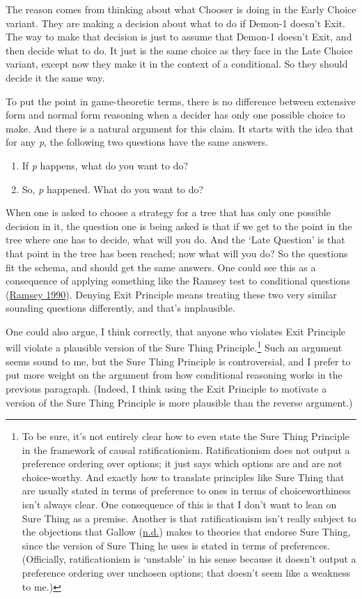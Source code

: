 \documentclass[
  12pt,
  letterpaper,
  DIV=11,
  numbers=noendperiod]{scrreprt}
\providecommand{\tightlist}{%
  \setlength{\itemsep}{0pt}\setlength{\parskip}{0pt}}\usepackage{longtable,booktabs,array}
\begin{document}
The reason comes from thinking about what Chooser is doing in the Early
Choice variant. They are making a decision about what to do if Demon-1
doesn't Exit. The way to make that decision is just to assume that
Demon-1 doesn't Exit, and then decide what to do. It just is the same
choice as they face in the Late Choice variant, except now they make it
in the context of a conditional. So they should decide it the same way.

To put the point in game-theoretic terms, there is no difference between
extensive form and normal form reasoning when a decider has only one
possible choice to make. And there is a natural argument for this claim.
It starts with the idea that for any \emph{p}, the following two
questions have the same answers.

\begin{enumerate}
\def\labelenumi{\arabic{enumi}.}
\tightlist
\item
  If \emph{p} happens, what do you want to do?
\item
  So, \emph{p} happened. What do you want to do?
\end{enumerate}

When one is asked to choose a strategy for a tree that has only one
possible decision in it, the question one is being asked is that if we
get to the point in the tree where one has to decide, what will you do.
And the `Late Question' is that that point in the tree has been reached;
now what will you do? So the questions fit the schema, and should get
the same answers. One could see this as a consequence of applying
something like the Ramsey test to conditional questions
(\protect\hyperlink{ref-RamseyGeneralProp}{Ramsey 1990}). Denying Exit
Principle means treating these two very similar sounding questions
differently, and that's implausible.

One could also argue, I think correctly, that anyone who violates Exit
Principle will violate a plausible version of the Sure Thing
Principle.\footnote{To be sure, it's not entirely clear how to even
  state the Sure Thing Principle in the framework of causal
  ratificationism. Ratificationism does not output a preference ordering
  over options; it just says which options are and are not
  choice-worthy. And exactly how to translate principles like Sure Thing
  that are usually stated in terms of preference to ones in terms of
  choiceworthiness isn't always clear. One consequence of this is that I
  don't want to lean on Sure Thing as a premise. Another is that
  ratificationism isn't really subject to the objections that Gallow
  (\protect\hyperlink{ref-Gallownd}{n.d.}) makes to theories that
  endorse Sure Thing, since the version of Sure Thing he uses is stated
  in terms of preferences. (Officially, ratificationism is `unstable' in
  his sense because it doesn't output a preference ordering over
  unchosen options; that doesn't seem like a weakness to me.)} Such an
argument seems sound to me, but the Sure Thing Principle is
controversial, and I prefer to put more weight on the argument from how
conditional reasoning works in the previous paragraph. (Indeed, I think
using the Exit Principle to motivate a version of the Sure Thing
Principle is more plausible than the reverse argument.)
\end{document}
